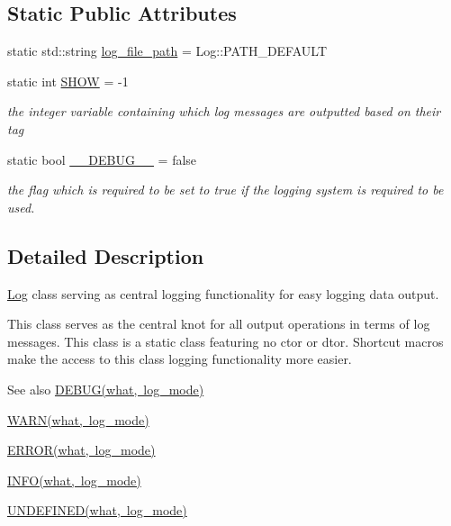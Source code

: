 \subsection*{Static Public Attributes}
\begin{DoxyCompactItemize}
\item 
static std\+::string \mbox{\hyperlink{class_log_a3f04a3b97491099c700f3807b013216f}{log\+\_\+file\+\_\+path}} = Log\+::\+P\+A\+T\+H\+\_\+\+D\+E\+F\+A\+U\+LT
\item 
static int \mbox{\hyperlink{class_log_a543d481ed0f4464f5190f5ef094bfc15}{S\+H\+OW}} = -\/1
\begin{DoxyCompactList}\small\item\em the integer variable containing which log messages are outputted based on their tag \end{DoxyCompactList}\item 
static bool \mbox{\hyperlink{class_log_a28d7b6a93a3775f300fe1cfdc228fef9}{\+\_\+\+\_\+\+D\+E\+B\+U\+G\+\_\+\+\_\+}} = false
\begin{DoxyCompactList}\small\item\em the flag which is required to be set to true if the logging system is required to be used. \end{DoxyCompactList}\end{DoxyCompactItemize}


\subsection{Detailed Description}
\mbox{\hyperlink{class_log}{Log}} class serving as central logging functionality for easy logging data output. 

This class serves as the central knot for all output operations in terms of log messages. This class is a static class featuring no ctor or dtor. Shortcut macros make the access to this class logging functionality more easier.

\begin{DoxySeeAlso}{See also}
\mbox{\hyperlink{_log_8hpp_adc1a465f17ca2c12d593fa15a8c8fd40}{D\+E\+B\+U\+G(what, log\+\_\+mode)}} 

\mbox{\hyperlink{_log_8hpp_a5bd302467724340230abb17ca367c761}{W\+A\+R\+N(what, log\+\_\+mode)}} 

\mbox{\hyperlink{_log_8hpp_a18da1c6c71ceabee4db6adc7eb2b5ce9}{E\+R\+R\+O\+R(what, log\+\_\+mode)}} 

\mbox{\hyperlink{_log_8hpp_a8d641516b0de7a8ce7ee11db4ce8247c}{I\+N\+F\+O(what, log\+\_\+mode)}} 

\mbox{\hyperlink{_log_8hpp_a51aaa455e6f8fe6985ac52069b7e74c6}{U\+N\+D\+E\+F\+I\+N\+E\+D(what, log\+\_\+mode)}} 
\end{DoxySeeAlso}


